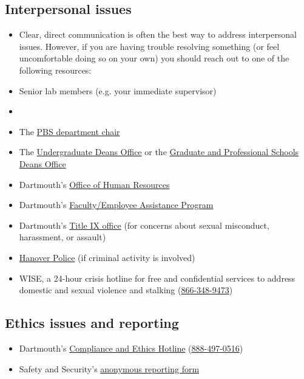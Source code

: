\documentclass{tufte-book} %
\begin{document}
\subsection{Interpersonal issues}\label{sec:interpersonal}
\begin{itemize}
\item Clear, direct communication is often the best way to address
  interpersonal issues. However, if you are having trouble resolving
  something (or feel uncomfortable doing so on your own) you should
  reach out to one of the following resources:

\item Senior lab members (e.g. your immediate supervisor)

\item \director

\item The \href{https://pbs.dartmouth.edu/people}{PBS department chair}

\item The
  \href{https://students.dartmouth.edu/undergraduate-deans/}{Undergraduate
    Deans Office} or the
  \href{mailto:Graduate.and.Advanced.Studies@Dartmouth.edu}{Graduate
    and Professional Schools Deans Office}

\item Dartmouth's \href{https://www.dartmouth.edu/~hrs/}{Office of
    Human Resources}

\item Dartmouth's
  \href{https://www.dartmouth.edu/~eap/}{Faculty/Employee Assistance
    Program}

\item Dartmouth's \href{https://sexual-respect.dartmouth.edu/}{Title
    IX office} (for concerns about sexual misconduct, harassment, or
  assault)

\item
  \href{https://www.hanovernh.org/hanover-police-department}{Hanover
    Police} (if criminal activity is involved)

\item WISE, a 24-hour crisis hotline for free and confidential
  services to address domestic and sexual violence and stalking
  (\href{tel:18884970516}{866-348-9473})

\end{itemize}

\subsection{Ethics issues and reporting}
\begin{itemize}

\item Dartmouth's
  \href{https://www.dartmouth.ethicspoint.com}{Compliance and Ethics
    Hotline} (\href{tel:18884970516}{888-497-0516})
\item Safety and Security's
  \href{https://www.dartmouth.edu/~security/services/forms/anonreport.html}{anonymous
    reporting form}

\end{itemize}
\end{document}
